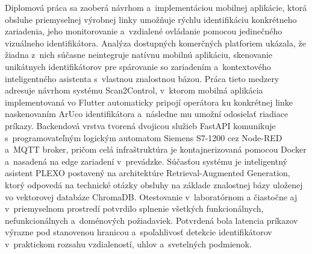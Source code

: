 Diplomová práca sa zaoberá návrhom a~implementáciou mobilnej aplikácie, ktorá
obsluhe priemyselnej výrobnej linky umožňuje rýchlu identifikáciu konkrétneho
zariadenia, jeho monitorovanie a~vzdialené ovládanie pomocou jedinečného
vizuálneho identifikátora. Analýza dostupných komerčných platforiem ukázala,
že žiadna z~nich súčasne neintegruje natívnu mobilnú aplikáciu, skenovanie
unikátnych identifikátorov pre spárovanie so zariadením a~kontextového
inteligentného asistenta s~vlastnou znalostnou bázou. Práca tieto medzery
adresuje návrhom systému Scan2Control, v~ktorom mobilná aplikácia
implementovaná vo Flutter automaticky pripojí operátora ku konkrétnej linke
naskenovaním ArUco identifikátora a~následne mu umožní odosielať riadiace
príkazy. Backendová vrstva tvorená dvojicou
služieb FastAPI komunikuje s~programovateľným logickým automatom Siemens
S7-1200 cez Node-RED a~MQTT broker, pričom celá infraštruktúra je
kontajnerizovaná pomocou Docker a~nasadená na edge zariadení v~prevádzke.
Súčasťou systému je inteligentný asistent PLEXO postavený na architektúre
Retrieval-Augmented Generation, ktorý odpovedá na technické otázky obsluhy
na základe znalostnej bázy uloženej vo vektorovej databáze ChromaDB.
Otestovanie v~laboratórnom a čiastočne aj v~priemyselnom prostredí potvrdilo splnenie
všetkých funkcionálnych, nefunkcionálnych a~doménových požiadaviek. Potvrdená bola latencia
príkazov výrazne pod stanovenou hranicou a~spoľahlivosť detekcie
identifikátorov v~praktickom rozsahu vzdialeností, uhlov a~svetelných
podmienok.
